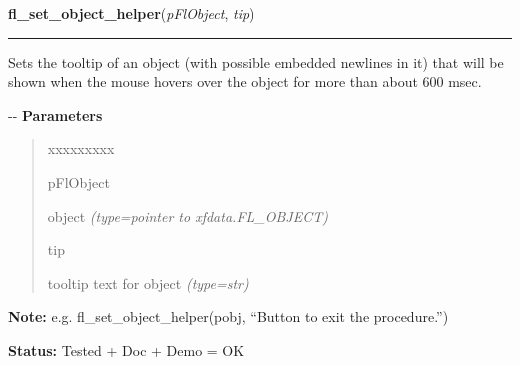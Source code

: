 \hspace{.8\funcindent}\begin{boxedminipage}{\funcwidth}

    \raggedright \textbf{fl\_set\_object\_helper}(\textit{pFlObject}, \textit{tip})

    \vspace{-1.5ex}

    \rule{\textwidth}{0.5\fboxrule}
\setlength{\parskip}{2ex}

Sets the tooltip of an object (with possible embedded newlines in it)
that will be shown when the mouse hovers over the object for more than
about 600 msec.

-{}-
\setlength{\parskip}{1ex}
      \textbf{Parameters}
      \vspace{-1ex}

      \begin{quote}
        \begin{Ventry}{xxxxxxxxx}

          \item[pFlObject]


object
            {\it (type=pointer to xfdata.FL\_OBJECT)}

          \item[tip]


tooltip text for object
            {\it (type=str)}

        \end{Ventry}

      \end{quote}

\textbf{Note:} 
e.g. fl\_set\_object\_helper(pobj, ``Button to exit the procedure.'')


\textbf{Status:} 
Tested + Doc + Demo = OK


    \end{boxedminipage}

    \label{xformslib:flbasic:fl_set_object_position}

    \vspace{0.5ex}

